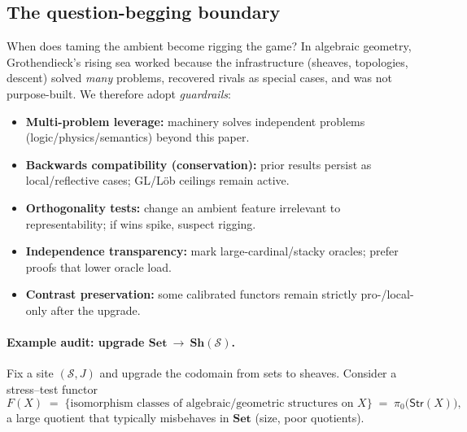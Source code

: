 \documentclass[11pt]{article}
\theoremstyle{upright}
\begin{document}
\subsection{The question-begging boundary}
When does taming the ambient become rigging the game? In algebraic geometry, Grothendieck’s rising sea worked because the infrastructure (sheaves, topologies, descent) solved \emph{many} problems, recovered rivals as special cases, and was not purpose-built. We therefore adopt \emph{guardrails}:

\begin{itemize}[leftmargin=2em]
\item \textbf{Multi-problem leverage:} machinery solves independent problems (logic/physics/semantics) beyond this paper.
\item \textbf{Backwards compatibility (conservation):} prior results persist as local/reflective cases; GL/Löb ceilings remain active.
\item \textbf{Orthogonality tests:} change an ambient feature irrelevant to representability; if wins spike, suspect rigging.
\item \textbf{Independence transparency:} mark large-cardinal/stacky oracles; prefer proofs that lower oracle load.
\item \textbf{Contrast preservation:} some calibrated functors remain strictly pro-/local-only after the upgrade.
\end{itemize}

\paragraph{Example audit: upgrade $\mathbf{Set}\ \to\ \mathbf{Sh}(\mathcal S)$.}
Fix a site $(\mathcal S,J)$ and upgrade the codomain from sets to sheaves. Consider a stress–test functor
\[
F(X)\;=\;\{\text{isomorphism classes of algebraic/geometric structures on }X\}\;=\;\pi_0\big(\mathsf{Str}(X)\big),
\]
a large quotient that typically misbehaves in $\mathbf{Set}$ (size, poor quotients).
\end{document}
